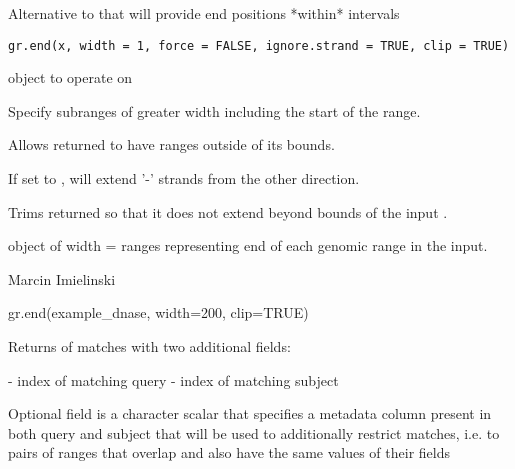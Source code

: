 \documentclass[a4paper]{book}
\begin{document}
%
\begin{Description}\relax
Alternative to  that will provide end positions *within* intervals
\end{Description}
%
\begin{Usage}
\begin{verbatim}
gr.end(x, width = 1, force = FALSE, ignore.strand = TRUE, clip = TRUE)
\end{verbatim}
\end{Usage}
%
\begin{Arguments}
\begin{ldescription}
\item[\code{x}]  object to operate on

\item[\code{width}] Specify subranges of greater width including the start of the range. \code{[1]}

\item[\code{force}] Allows returned  to have ranges outside of its  bounds. \code{[FALSE]}

\item[\code{ignore.strand}] If set to , will extend '-' strands from the other direction. \code{[TRUE]}

\item[\code{clip}] Trims returned  so that it does not extend beyond bounds of the input . \code{[TRUE]}
\end{ldescription}
\end{Arguments}
%
\begin{Value}
 object of width =  ranges representing end of each genomic range in the input.
\end{Value}
%
\begin{Author}\relax
Marcin Imielinski
\end{Author}
%
\begin{Examples}
\begin{ExampleCode}
gr.end(example_dnase, width=200, clip=TRUE)
\end{ExampleCode}
\end{Examples}
%
\begin{Description}\relax
Returns  of matches with two additional fields:
\begin{itemize}

 - index of matching query
 - index of matching subject

\end{itemize}

Optional  field is a character scalar that specifies a metadata column present in both query and subject
that will be used to additionally restrict matches, i.e. to pairs of ranges that overlap and also
have the same values of their  fields
\end{Description}
\end{document}
